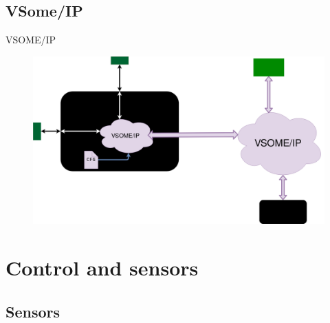 \documentclass{beamer}
\begin{document}
\subsection{VSome/IP}
\begin{frame}{VSOME/IP}
    \begin{figure}
        \includegraphics[width=\linewidth]{vsomeip.png}
    \end{figure}    
\end{frame}

\section{Control and sensors }
\subsection{Sensors}
\end{document}
